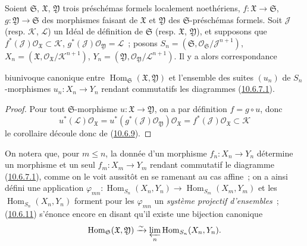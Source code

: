 \begin{corollary}[10.6.11]
\label{I.10.6.11-fr}
Soient $\mathfrak{S}$, $\mathfrak{X}$, $\mathfrak{Y}$ trois
préschémas formels localement noethériens,
$f:\mathfrak{X}\to\mathfrak{S}$,
$g:\mathfrak{Y}\to\mathfrak{S}$ des morphismes faisant de
$\mathfrak{X}$ et $\mathfrak{Y}$ des $\mathfrak{S}$-préschémas
formels. Soit $\mathscr{J}$ \textup{(resp. $\mathscr{K}$, $\mathscr{L}$)} un
Idéal de définition de $\mathfrak{S}$ \textup{(resp. $\mathfrak{X}$,
$\mathfrak{Y}$)}, et supposons que
$f^*(\mathscr{J})\mathscr{O}_{\mathfrak{X}}\subset\mathscr{K}$,
$g^*(\mathscr{J})\mathscr{O}_{\mathfrak{Y}}=\mathscr{L}$~; posons
$S_n=(\mathfrak{S},
\mathscr{O}_{\mathfrak{S}}/\mathscr{J}^{n+1})$,
$X_n=(\mathfrak{X},
\mathscr{O}_{\mathfrak{X}}/\mathscr{K}^{n+1})$,
$Y_n=(\mathfrak{Y},
\mathscr{O}_{\mathfrak{Y}}/\mathscr{L}^{n+1})$. Il y a alors
correspondance


biunivoque canonique entre
$\operatorname{Hom}_{\mathfrak{S}}(\mathfrak{X},\mathfrak{Y})$ et
l'ensemble des suites $(u_n)$ de $S_n$-morphismes
$u_n:X_n\to Y_n$ rendant commutatifs les diagrammes
\textup{(\hyperref[I.10.6.7.1-fr]{10.6.7.1})}.
\end{corollary}

\begin{proof}
Pour tout $\mathfrak{S}$-morphisme
$u:\mathfrak{X}\to\mathfrak{Y}$, on a par définition $f=g\circ u$, donc
\[
  u^*(\mathscr{L})\mathscr{O}_{\mathfrak{X}}
  =u^*(g^*(\mathscr{J})\mathscr{O}_{\mathfrak{Y}})
    \mathscr{O}_{\mathfrak{X}}
  =f^*(\mathscr{J})\mathscr{O}_{\mathfrak{X}}
  \subset\mathscr{K}
\]
le corollaire découle donc de
(\hyperref[I.10.6.9-fr]{10.6.9}).
\end{proof}

On notera que, pour $m\leq n$, la donnée d'un morphisme
$f_n:X_n\to Y_n$ détermine un morphisme et un seul
$f_m:X_m\to Y_m$ rendant commutatif le diagramme
(\hyperref[I.10.6.7.1-fr]{10.6.7.1}), comme on le voit aussitôt en se
ramenant au cas affine~; on a ainsi défini une application
$\varphi_{mn}:\operatorname{Hom}_{S_n}(X_n,Y_n)
\to\operatorname{Hom}_{S_m}(X_m,Y_m)$ et les
$\operatorname{Hom}_{S_n}(X_n,Y_n)$ forment pour les $\varphi_{mn}$ un
\emph{système projectif d'ensembles}~;
(\hyperref[I.10.6.11-fr]{10.6.11}) s'énonce encore en disant qu'il existe
une bijection canonique
\[
  \operatorname{Hom}_{\mathfrak{S}}(\mathfrak{X},\mathfrak{Y})
  \xrightarrow{\sim}
  \varprojlim_n\operatorname{Hom}_{S_n}(X_n,Y_n).
\]

